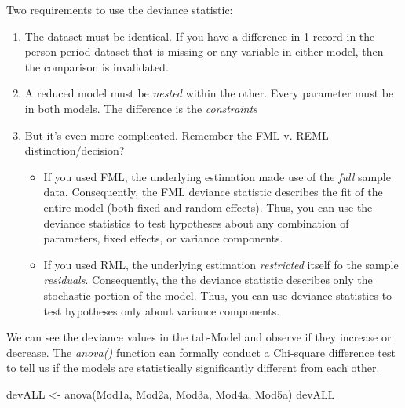 \documentclass[
  11pt,
]{book}
\newenvironment{Shaded}{\begin{snugshade}}{\end{snugshade}}
\newcommand{\FunctionTok}[1]{\textcolor[rgb]{0.00,0.00,0.00}{#1}}
\newcommand{\NormalTok}[1]{#1}
\newcommand{\OtherTok}[1]{\textcolor[rgb]{0.56,0.35,0.01}{#1}}
\providecommand{\tightlist}{%
  \setlength{\itemsep}{0pt}\setlength{\parskip}{0pt}}
\begin{document}
Two requirements to use the deviance statistic:

\begin{enumerate}
\def\labelenumi{\arabic{enumi}.}
\tightlist
\item
  The dataset must be identical. If you have a difference in 1 record in the person-period dataset that is missing or any variable in either model, then the comparison is invalidated.
\item
  A reduced model must be \emph{nested} within the other. Every parameter must be in both models. The difference is the \emph{constraints}
\item
  But it's even more complicated. Remember the FML v. REML distinction/decision?

  \begin{itemize}
  \tightlist
  \item
    If you used FML, the underlying estimation made use of the \emph{full} sample data. Consequently, the FML deviance statistic describes the fit of the entire model (both fixed and random effects). Thus, you can use the deviance statistics to test hypotheses about any combination of parameters, fixed effects, or variance components.
  \item
    If you used RML, the underlying estimation \emph{restricted} itself fo the sample \emph{residuals}. Consequently, the the deviance statistic describes only the stochastic portion of the model. Thus, you can use deviance statistics to test hypotheses only about variance components.
  \end{itemize}
\end{enumerate}

We can see the deviance values in the tab-Model and observe if they increase or decrease. The \emph{anova()} function can formally conduct a Chi-square difference test to tell us if the models are statistically significantly different from each other.

\begin{Shaded}
\begin{Highlighting}[]
\NormalTok{devALL }\OtherTok{\textless{}{-}} \FunctionTok{anova}\NormalTok{(Mod1a, Mod2a, Mod3a, Mod4a, Mod5a) }
\NormalTok{devALL}
\end{Highlighting}
\end{Shaded}
\end{document}
